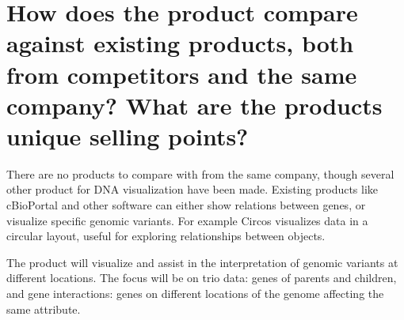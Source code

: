 \section{How does the product compare against existing products, both from competitors and the same company? What are the products unique selling points?}
There are no products to compare with from the same company, though several other product for DNA visualization have been made.
Existing products like cBioPortal \cite{cbio} and other software can either show relations between genes, or visualize specific genomic variants. %
For example Circos \cite{circos} visualizes data in a circular layout, useful for exploring relationships between objects.


The product will visualize and assist in the interpretation of genomic variants at different locations.
The focus will be on trio data: genes of parents and children, and gene interactions: genes on different locations of the genome affecting the same attribute.

